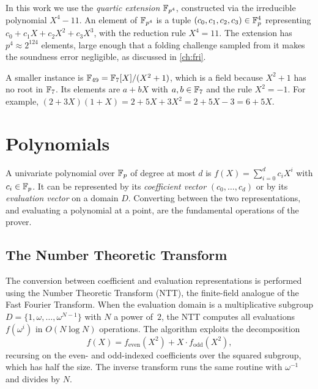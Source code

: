 In this work we use the \emph{quartic extension} $\mathbb{F}_{p^4}$, constructed
via the irreducible polynomial $X^4 - 11$. An element of $\mathbb{F}_{p^4}$ is a
tuple $(c_0, c_1, c_2, c_3) \in \mathbb{F}_p^4$ representing
$c_0 + c_1 X + c_2 X^2 + c_3 X^3$, with the reduction rule $X^4 = 11$.
The extension has $p^4 \approx 2^{124}$ elements, large enough that a
folding challenge sampled from it makes the soundness error negligible,
as discussed in \cref{ch:fri}.

\begin{example}
\label{ex:field_ext}
A smaller instance is $\mathbb{F}_{49} = \mathbb{F}_7[X]/(X^2 + 1)$, which is a field
because $X^2 + 1$ has no root in $\mathbb{F}_7$. Its elements are $a + bX$ with
$a, b \in \mathbb{F}_7$ and the rule $X^2 = -1$. For example,
$(2 + 3X)(1 + X) = 2 + 5X + 3X^2 = 2 + 5X - 3 = 6 + 5X$.
\end{example}


\section{Polynomials}
\label{sec:polynomials}

A univariate polynomial over $\mathbb{F}_p$ of degree at most $d$ is
$f(X) = \sum_{i=0}^{d} c_i X^i$ with $c_i \in \mathbb{F}_p$. It can be
represented by its \emph{coefficient vector} $(c_0, \ldots, c_d)$ or
by its \emph{evaluation vector} on a domain $D$. Converting between
the two representations, and evaluating a polynomial at a point, are
the fundamental operations of the prover.


\subsection{The Number Theoretic Transform}
\label{subsec:ntt}

The conversion between coefficient and evaluation representations is
performed using the Number Theoretic Transform (NTT), the finite-field
analogue of the Fast Fourier Transform. When the evaluation domain is
a multiplicative subgroup
$D = \{1, \omega, \ldots, \omega^{N-1}\}$ with $N$ a power of~$2$, the
NTT computes all evaluations $f(\omega^i)$ in $O(N \log N)$ operations.
The algorithm exploits the decomposition
%
\[
f(X) = f_{\mathrm{even}}(X^2) + X \cdot f_{\mathrm{odd}}(X^2),
\]
%
recursing on the even- and odd-indexed coefficients over the squared
subgroup, which has half the size. The inverse transform runs the same
routine with $\omega^{-1}$ and divides by $N$.


